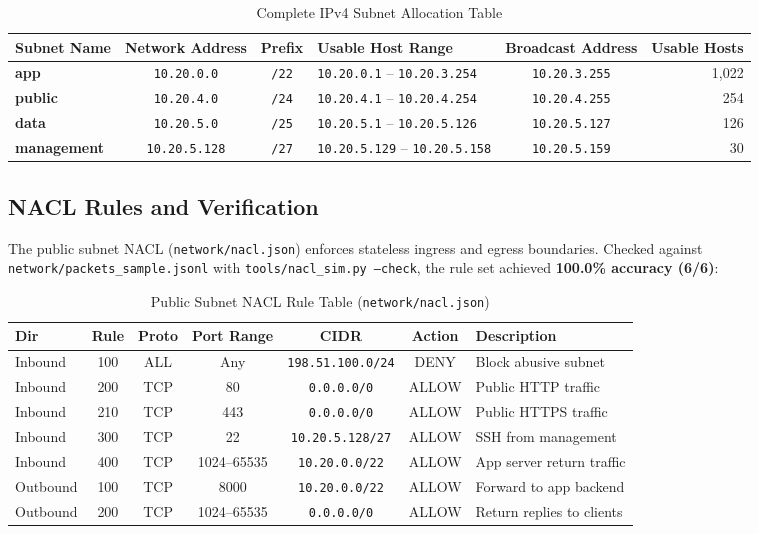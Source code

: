 \documentclass[10pt,a4paper]{article}
\begin{document}
\begin{table}[h!]
\centering
\small
\caption{Complete IPv4 Subnet Allocation Table}
\begin{tabularx}{\textwidth}{l c c >{\centering\arraybackslash}X c r}
\toprule
\textbf{Subnet Name} & \textbf{Network Address} & \textbf{Prefix} & \textbf{Usable Host Range} & \textbf{Broadcast Address} & \textbf{Usable Hosts} \\
\midrule
\textbf{app} & \texttt{10.20.0.0} & \texttt{/22} & \texttt{10.20.0.1} – \texttt{10.20.3.254} & \texttt{10.20.3.255} & 1,022 \\
\textbf{public} & \texttt{10.20.4.0} & \texttt{/24} & \texttt{10.20.4.1} – \texttt{10.20.4.254} & \texttt{10.20.4.255} & 254 \\
\textbf{data} & \texttt{10.20.5.0} & \texttt{/25} & \texttt{10.20.5.1} – \texttt{10.20.5.126} & \texttt{10.20.5.127} & 126 \\
\textbf{management} & \texttt{10.20.5.128} & \texttt{/27} & \texttt{10.20.5.129} – \texttt{10.20.5.158} & \texttt{10.20.5.159} & 30 \\
\bottomrule
\end{tabularx}
\end{table}

\subsection{NACL Rules and Verification}
The public subnet NACL (\texttt{network/nacl.json}) enforces stateless ingress and egress boundaries. Checked against \texttt{network/packets\_sample.jsonl} with \texttt{tools/nacl\_sim.py --check}, the rule set achieved \textbf{100.0\% accuracy (6/6)}:

\begin{table}[h!]
\centering
\small
\caption{Public Subnet NACL Rule Table (\texttt{network/nacl.json})}
\begin{tabularx}{\textwidth}{l c c c c c X}
\toprule
\textbf{Dir} & \textbf{Rule} & \textbf{Proto} & \textbf{Port Range} & \textbf{CIDR} & \textbf{Action} & \textbf{Description} \\
\midrule
Inbound & 100 & ALL & Any & \texttt{198.51.100.0/24} & DENY & Block abusive subnet \\
Inbound & 200 & TCP & 80 & \texttt{0.0.0.0/0} & ALLOW & Public HTTP traffic \\
Inbound & 210 & TCP & 443 & \texttt{0.0.0.0/0} & ALLOW & Public HTTPS traffic \\
Inbound & 300 & TCP & 22 & \texttt{10.20.5.128/27} & ALLOW & SSH from management \\
Inbound & 400 & TCP & 1024--65535 & \texttt{10.20.0.0/22} & ALLOW & App server return traffic \\
\midrule
Outbound & 100 & TCP & 8000 & \texttt{10.20.0.0/22} & ALLOW & Forward to app backend \\
Outbound & 200 & TCP & 1024--65535 & \texttt{0.0.0.0/0} & ALLOW & Return replies to clients \\
\bottomrule
\end{tabularx}
\end{table}
\end{document}
